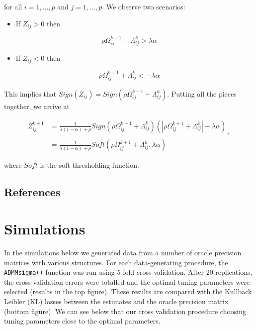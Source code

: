 \documentclass[11pt,]{book}
\providecommand{\tightlist}{%
  \setlength{\itemsep}{0pt}\setlength{\parskip}{0pt}}
\theoremstyle{definition}
\theoremstyle{definition}
\theoremstyle{definition}
\theoremstyle{remark}
\begin{document}
for all \(i = 1,..., p\) and \(j = 1,..., p\). We observe two scenarios:

\begin{itemize}
\tightlist
\item
  If \(Z_{ij} > 0\) then
\end{itemize}

\[ \rho\Omega_{ij}^{k + 1} + \Lambda_{ij}^{k} > \lambda\alpha \]

\begin{itemize}
\tightlist
\item
  If \(Z_{ij} < 0\) then
\end{itemize}

\[ \rho\Omega_{ij}^{k + 1} + \Lambda_{ij}^{k} < -\lambda\alpha \]

This implies that
\(Sign(Z_{ij}) = Sign(\rho\Omega_{ij}^{k + 1} + \Lambda_{ij}^{k})\).
Putting all the pieces together, we arrive at

\begin{align*}
Z_{ij}^{k + 1} &= \frac{1}{\lambda(1 - \alpha) + \rho}Sign\left(\rho\Omega_{ij}^{k + 1} + \Lambda_{ij}^{k}\right)\left( \left| \rho\Omega_{ij}^{k + 1} + \Lambda_{ij}^{k} \right| - \lambda\alpha \right)_{+} \\
&= \frac{1}{\lambda(1 - \alpha) + \rho}Soft\left(\rho\Omega_{ij}^{k + 1} + \Lambda_{ij}^{k}, \lambda\alpha\right)
\end{align*}

where \(Soft\) is the soft-thresholding function.

\newpage

\hypertarget{references}{%
\section{References}\label{references}}

\hypertarget{simulations}{%
\chapter{Simulations}\label{simulations}}

In the simulations below we generated data from a number of oracle
precision matrices with various structures. For each data-generating
procedure, the \texttt{ADMMsigma()} function was run using 5-fold cross
validation. After 20 replications, the cross validation errors were
totalled and the optimal tuning parameters were selected (results in the
top figure). These results are compared with the Kullback Leibler (KL)
losses between the estimates and the oracle precision matrix (bottom
figure). We can see below that our cross validation procedure choosing
tuning parameters close to the optimal parameters.
\end{document}
